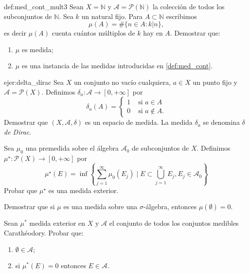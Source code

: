 \documentclass{book}
\begin{document}
\begin{ejer}{def:med_cont_mult3} Sean $X=\mathbb{N}$  y $\mathscr{A}=\mathcal{P}(\mathbb{N})$ la colección de todos los subconjuntos de $\mathbb{N}$. Sea $k$ un natural fijo. Para $A\subset\mathbb{N}$ escribimos
\[
 \mu(A)=\#\{ n\in A :  k|n \},
\]
es decir $\mu(A)$ cuenta cuántos múltiplos de $k$ hay en $A$. Demostrar que: 
\begin{enumerate}
    \item $\mu$ es medida;
    \item $\mu$ es una instancia de las medidas introducidas en \eqref {def:med_cont}. 
\end{enumerate}
\end{ejer}


\begin{ejer}{ejer:delta_dirac}
 Sea $X$ un conjunto no vacío cualquiera, $a\in X$ un punto fijo y $\mathscr{A}=\mathcal{P}(X)$. Definimos $\delta_a:\mathscr{A}\to [0,+\infty]$ por
 \[
  \delta_a(A)=\left\{\begin{array}{ll} 1 &\text{ si } a\in A\\0 &\text{ si } a\notin A.\end{array}\right.
 \]
 Demostrar que $(X,\mathscr{A},\delta)$ es un espacio de medida. La medida $\delta_a$
se denomina \emph{$\delta$ de Dirac}. 
\end{ejer}
 

\begin{ejer}{} 
 Sea $\mu_0$ una premedida sobre el álgebra  $\mathscr{A}_0$ de subconjuntos de $X$. Definimos  $\mu^\star:\mathcal{P}(X)\to [0,+\infty]$ por
 \begin{equation}\label{eq:defi_med_ext}
  \mu^\star(E)=\inf\left\{ \sum_{j=1}^{\infty}\mu_0(E_j)\mid E\subset \bigcup_{j=1}^{\infty}E_j, E_j\in\mathcal{A}_0  \right\}
 \end{equation}
Probar que  $\mu^\star$ es una medida exterior. 

  
\end{ejer}

\begin{ejer}{} Demostrar que si $\mu$ es una medida sobre una $\sigma$-álgebra,  entonces $\mu(\emptyset)=0$.
\end{ejer}

\begin{ejer}{}
Sean $\mu^*$ medida exterior en $X$ y $\mathscr{A}$ el conjunto de todos los conjuntos  medibles Carathéodory.
Probar que:
\begin{enumerate}
\item $\emptyset  \in \mathscr{A}$;
\item si $\mu^{*}(E)=0$ entonces $E \in \mathscr{A}$.
\end{enumerate}
\end{ejer}
\end{document}
